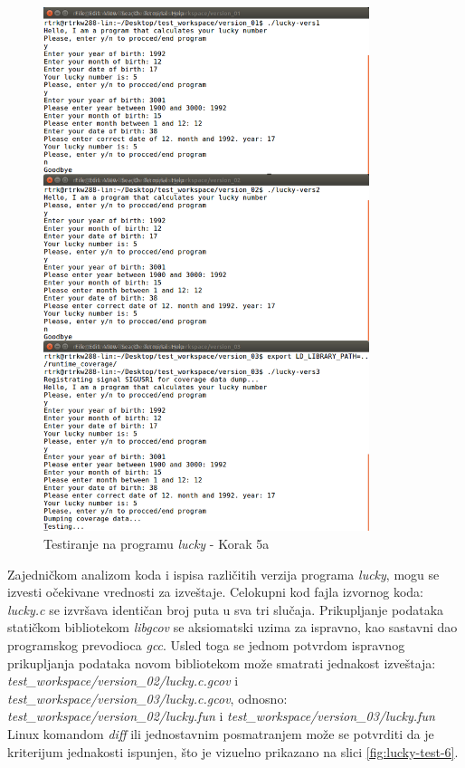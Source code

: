 \documentclass[12pt,oneside]{memoir}
\newcommand{\strano}[1]{\textit{#1}}
\begin{document}
\begin{figure}[!ht]
  \centering
  \includegraphics[width=0.85\textwidth]{img/lucky5-ng.png}
  \caption{Testiranje na programu \strano{lucky} - Korak 5a}
  \label{fig:lucky-test-5}
\end{figure}

Zajedničkom analizom koda i ispisa različitih verzija programa \strano{lucky}, mogu se izvesti očekivane vrednosti za izveštaje. Celokupni kod fajla izvornog koda: \strano{lucky.c} se izvršava identičan broj puta u sva tri slučaja. Prikupljanje podataka statičkom bibliotekom \strano{libgcov} se aksiomatski uzima za ispravno, kao sastavni dao programskog prevodioca \strano{gcc}. Usled toga se jednom potvrdom ispravnog prikupljanja podataka novom bibliotekom može smatrati jednakost izveštaja: \\ \strano{test\_workspace/version\_02/lucky.c.gcov} i \strano{test\_workspace/version\_03/lucky.c.gcov}, odnosno: \\
\strano{test\_workspace/version\_02/lucky.fun} i \strano{test\_workspace/version\_03/lucky.fun}  \\
Linux komandom \strano{diff} ili jednostavnim posmatranjem može se potvrditi da je kriterijum jednakosti ispunjen, što je vizuelno prikazano na slici \ref{fig:lucky-test-6}.
\end{document}
